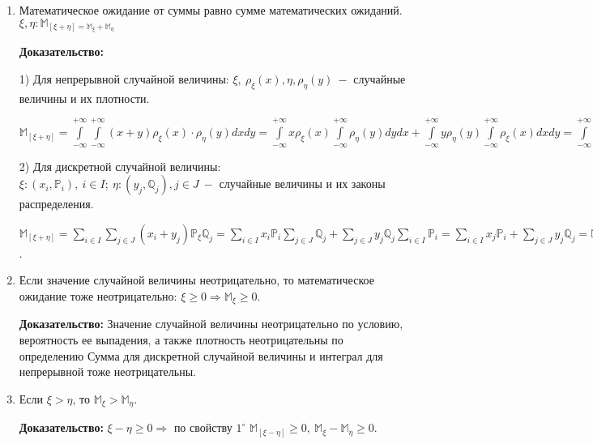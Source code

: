 \documentclass[../Main.tex]{subfiles}
\begin{document}
\begin{enumerate}
    \item Математическое ожидание от суммы равно сумме математических ожиданий. \(\xi, \eta: \mathbb{M}_{[\xi + \eta] = \mathbb{M}_\xi + \mathbb{M}_\eta}\)

    \textbf{Доказательство:}
    
    1) Для непрерывной случайной величины: \(\xi, \ \rho_\xi(x), \eta, \rho_\eta(y)\ -\) случайные величины и их плотности.

    \(\mathbb{M}_{[\xi + \eta]} = \overset{+\infty}{\underset{-\infty}{\int}}\overset{+\infty}{\underset{-\infty}{\int}} (x+y) \rho_\xi(x)\cdot \rho_\eta (y) dxdy = \overset{+\infty}{\underset{-\infty}{\int}}x \rho_\xi(x)\overset{+\infty}{\underset{-\infty}{\int}}\rho_\eta (y)dydx + \overset{+\infty}{\underset{-\infty}{\int}} y \rho_\eta (y) \overset{+\infty}{\underset{-\infty}{\int}} \rho_\xi(x)dxdy = \overset{+\infty}{\underset{-\infty}{\int}}x \rho_\xi(x)dx + \overset{+\infty}{\underset{-\infty}{\int}} y \rho_\eta(y)dy = M_\xi + M_\eta\)

    2) Для дискретной случайной величины: \(\xi:(x_i, \mathbb{P}_i),\ i \in I;\ \eta:(y_j, \mathbb{Q}_j), j \in J\ -\) случайные величины и их законы распределения. 

    \(\mathbb{M}_{[\xi+\eta]}=\underset{i \in I}{\sum}\underset{j \in J}{\sum}(x_i + y_j)\mathbb{P}_\xi \mathbb{Q}_j = \underset{i \in I}{\sum}x_i \mathbb{P}_i\underset{j \in J}{\sum}\mathbb{Q}_j+\underset{j \in J}{\sum}y_j \mathbb{Q}_j \underset{i \in I}{\sum}\mathbb{P}_i = \underset{i \in I}{\sum}x_j \mathbb{P}_i + \underset{j \in J}{\sum}y_j \mathbb{Q}_j = \mathbb{M}_\xi + \mathbb{M}_\eta\).

    \item Если значение случайной величины неотрицательно, то математическое ожидание тоже неотрицательно: \(\xi \geq 0 \Rightarrow \mathbb{M}_\xi \geq 0\).

    \textbf{Доказательство:} Значение случайной величины неотрицательно по условию, вероятность ее выпадения, а также плотность неотрицательны по определению \Rightarrow Сумма для дискретной случайной величины и интеграл для непрерывной тоже неотрицательны.

    \item Если \(\xi > \eta\), то \(\mathbb{M}_\xi > \mathbb{M}_\eta\).

    \textbf{Доказательство:} \(\xi - \eta \geq 0\Rightarrow\) по свойству \(1^\circ\) \(\mathbb{M}_{[\xi-\eta]} \geq 0,\ \mathbb{M}_\xi - \mathbb{M}_\eta \geq 0\).


\end{enumerate}
\end{document}
